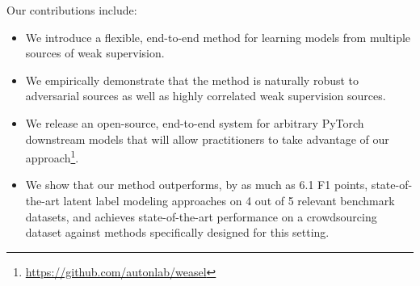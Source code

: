 \documentclass{article}
\begin{document}
Our contributions include:
\begin{itemize}[leftmargin=*]
    \item We introduce a flexible, end-to-end method for learning models from multiple sources of weak supervision. 
    \item We empirically demonstrate that the method is naturally robust to adversarial sources as well as highly correlated weak supervision sources. 
    \item
    We release an open-source, end-to-end system for arbitrary PyTorch downstream models that will allow practitioners to take advantage of our approach\footnote{\url{https://github.com/autonlab/weasel}}.
    \item
    We show that our method outperforms, by as much as 6.1 F1 points, state-of-the-art latent label modeling approaches on 4 out of 5 relevant benchmark datasets, and achieves state-of-the-art performance on a crowdsourcing dataset against methods specifically designed for this setting.
\end{itemize}
 
\end{document}
